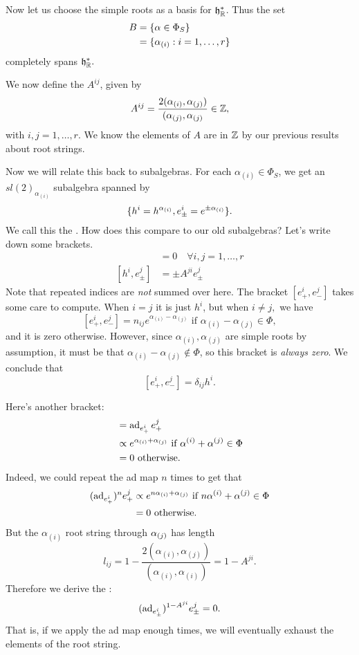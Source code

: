 Now let us choose the simple roots as a basis for $\mathfrak{h}_{\mathbb{R}}^*$. Thus the set
\begin{align*}
    B&=\{\alpha \in \Phi_S\}\\
    &= \{\alpha_{(i)}:i=1,\ldots,r\}
\end{align*}
completely spans $\mathfrak{h}_{\mathbb{R}}^*.$
\begin{defn}
We now define the  $A^{ij}$, given by
\begin{equation}\label{defn:cartan}
A^{ij} = \frac{2(\alpha_{(i)}, \alpha_{(j)})} {(\alpha_{(j)},\alpha_{(j)}}\in \mathbb{Z},
\end{equation}
with $i,j=1,\ldots,r$. We know the elements of $A$ are in $\mathbb{Z}$ by our previous results about root strings.
\end{defn}

Now we will relate this back to subalgebras. For each $\alpha_{(i)}\in \Phi_S$, we get an $sl(2)_{\alpha_{(i)}}$ subalgebra spanned by
$$\{h^i=h^{\alpha_{(i)}}, e^i_\pm =e^{\pm \alpha_{(i)}}\}.$$
We call this the . How does this compare to our old subalgebras? Let's write down some brackets.
\begin{align*}
    [h^i,h^j]&= 0 \quad \forall i,j=1,\ldots,r\\
    [h^i,e^j_\pm]&= \pm A^{ji} e^j_\pm
\end{align*}
Note that repeated indices are \emph{not} summed over here.
The bracket $[e_+^i,e_-^j]$ takes some care to compute. When $i=j$ it is just $h^i$, but when $i\neq j,$ we have
$$[e_+^i, e_-^j]= n_{ij} e^{\alpha_{(i)}-\alpha_{(j)}} \text{ if } \alpha_{(i)}-\alpha_{(j)}\in \Phi,$$
and it is zero otherwise. However, since $\alpha_{(i)},\alpha_{(j)}$ are simple roots by assumption, it must be that $\alpha_{(i)}-\alpha_{(j)}\notin \Phi$, so this bracket is \emph{always zero}. We conclude that
$$[e_+^i,e_-^j]=\delta_{ij}h^i.$$

Here's another bracket:
\begin{align*}
    [e_+^i,e_+^j]&= \ad_{e_+^i} e_+^j\\
    &\propto e^{\alpha_{(i)}+\alpha_{(j)}}\text{ if } \alpha^{(i)}+\alpha^{(j)}\in \Phi\\
    &= 0\text{ otherwise}.
\end{align*}
Indeed, we could repeat the ad map $n$ times to get that
\begin{align*}
    (\operatorname{ad}_{e_+^i})^n e_+^j&\propto e^{n\alpha_{(i)}+\alpha_{(j)}}\text{ if } n\alpha^{(i)}+\alpha^{(j)}\in \Phi\\
    &= 0\text{ otherwise}.
\end{align*}
But the $\alpha_{(i)}$ root string through $\alpha_{(j)}$ has length
$$l_{ij}=1-\frac{2(\alpha_{(i)},\alpha_{(j)})} {(\alpha_{(i)},\alpha_{(i)})}=1-A^{ji}.$$
Therefore we derive the :
\begin{equation}
(\operatorname{ad}_{e_\pm^i})^{1-A^{ji}}e_\pm^j =0.
\end{equation}
That is, if we apply the ad map enough times, we will eventually exhaust the elements of the root string.

